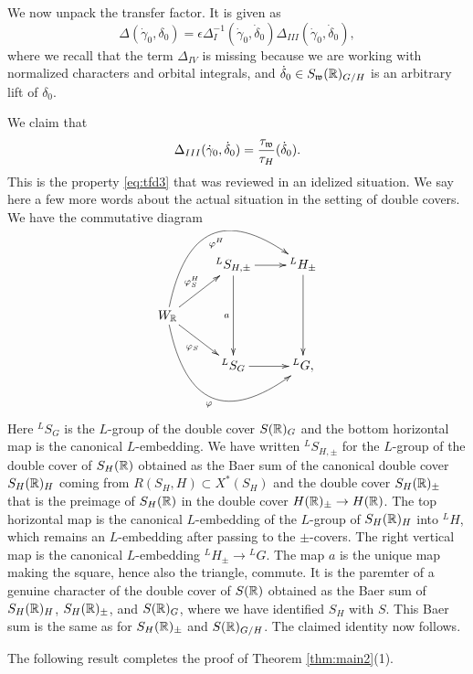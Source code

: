 \documentclass{article}
\theoremstyle{definition}
\numberwithin{equation}{section}
\renewcommand{\-}{\hyp{}}
\begin{document}
We now unpack the transfer factor. It is given as
\[ \Delta(\dot\gamma_0,\delta_0) = \epsilon\Delta_I^{-1}(\dot\gamma_0,\dot\delta_0)\Delta_{III}(\dot\gamma_0,\dot\delta_0), \]
where we recall that the term $\Delta_{IV}$ is missing because we are working with normalized characters and orbital integrals, and $\dot\delta_0 \in S_{\mathfrak{w}}(\mathbb{R})_{G/H}$ is an arbitrary lift of $\delta_0$.

We claim that
\[ \Delta_{III}(\dot\gamma_0,\dot\delta_0) = \frac{\tau_{\mathfrak{w}}}{\tau_H}(\dot\delta_0). \]
This is the property \eqref{eq:tfd3} that was reviewed in an idelized situation. We say here a few more words about the actual situation in the setting of double covers. We have the commutative diagram
\[ \xymatrix{
	&^LS_{H,\pm}\ar[dd]_a\ar[r]&^LH_\pm\ar[dd]\\
	W_\R\ar[ru]^{\varphi^H_S}\ar@/^4pc/[rru]_-{\varphi^H}\ar[rd]_{\varphi_S}\ar@/_4pc/[rrd]_-{\varphi}\\
	&^LS_G\ar[r]&^LG,
}
\]
Here $^LS_G$ is the $L$\-group of the double cover $S(\mathbb{R})_G$ and the bottom horizontal map is the canonical $L$\-embedding. We have written $^LS_{H,\pm}$ for the $L$\-group of the double cover of $S_H(\mathbb{R})$ obtained as the Baer sum of the canonical double cover $S_H(\mathbb{R})_H$ coming from $R(S_H,H) \subset X^*(S_H)$ and the double cover $S_H(\mathbb{R})_\pm$ that is the preimage of $S_H(\mathbb{R})$ in the double cover $H(\mathbb{R})_\pm \to H(\mathbb{R})$. The top horizontal map is the canonical $L$\-embedding of the $L$\-group of $S_H(\mathbb{R})_H$ into $^LH$, which remains an $L$\-embedding after passing to the $\pm$-covers. The right vertical map is the canonical $L$\-embedding $^LH_\pm \to {^LG}$. The map $a$ is the unique map making the square, hence also the triangle, commute. It is the paremter of a genuine character of the double cover of $S(\mathbb{R})$ obtained as the Baer sum of $S_H(\mathbb{R})_H$, $S_H(\mathbb{R})_\pm$, and $S(\mathbb{R})_G$, where we have identified $S_H$ with $S$. This Baer sum is the same as for $S_H(\mathbb{R})_\pm$ and $S(\mathbb{R})_{G/H}$. The claimed identity now follows.

The following result completes the proof of Theorem \ref{thm:main2}(1).
\end{document}
